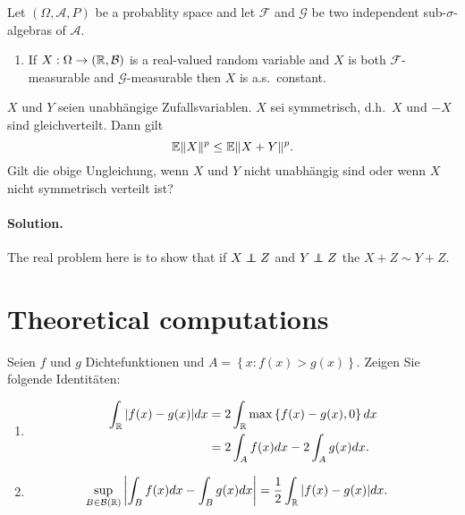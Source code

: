 Let $(\Omega, \mathcal A, P)$ be a probablity space and let $\mathcal F$ and
$\mathcal G$ be two independent sub-$\sigma$-algebras of $\mathcal A$.

\begin{enumerate} 
\item If $X: \Omega \to (\mathbb{R}, \mathcal B)$ is a
    real-valued random variable and $X$ is both $\mathcal F$-measurable
    and $\mathcal G$-measurable then $X$ is a.s.~constant.
\end{enumerate}


$X$ und $Y$ seien unabhängige Zufallsvariablen. $X$ sei symmetrisch, 
d.h.\ $X$ und $-X$ sind gleichverteilt. Dann gilt
\begin{equation}
    \mathbb{E} \| X \|^p \leq \mathbb{E} \| X + Y \|^p.
\end{equation}
Gilt die obige Ungleichung, wenn $X$ und $Y$ nicht unabhängig sind oder wenn 
$X$ nicht symmetrisch verteilt ist?

\paragraph*{Solution. } The real problem here is to show that if $X \upmodels Z$
and $Y \upmodels Z$ the $X+Z \sim Y+Z$. 



\section{Theoretical computations}

 Seien $f$ und $g$
Dichtefunktionen und $A = \left\{ x : f(x)>g(x) \right\}$. 
Zeigen Sie folgende Identitäten:
\begin{enumerate}
    \item \begin{align*}
            \int_{\mathbb R} |f(x)-g(x)| dx &= 2 \int_{\mathbb R} \max\left\{ f(x)-g(x), 0 \right\} dx \\
            &= 2 \int_{A} f(x)dx - 2 \int_{A} g(x)dx.
        \end{align*}
    \item \begin{align*}
            \sup_{B\in\mathcal B(\mathbb{R})} \left| \int_{B} f(x)dx - \int_{B} g(x)dx \right| &=
            \frac{1}{2} \int_{\mathbb R} |f(x)-g(x)|dx.
        \end{align*}
\end{enumerate}


